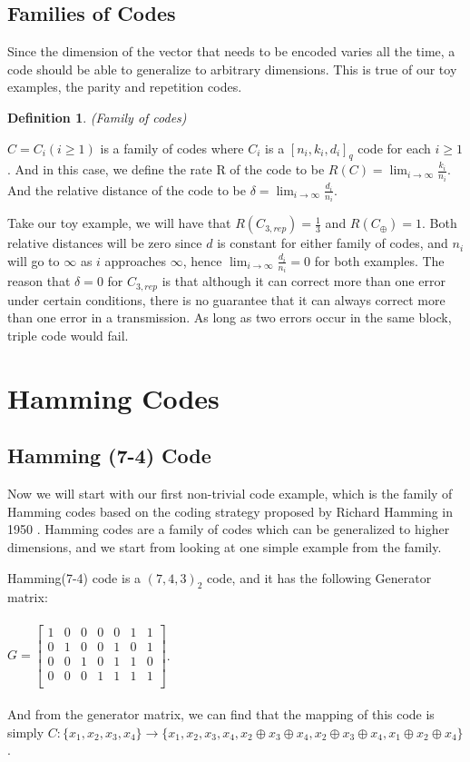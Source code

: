 \documentclass{article}
\newtheorem{Definition}{Definition}
\begin{document}
\subsection{Families of Codes}
Since the dimension of the vector that needs to be encoded varies all the time, a code should be able to generalize to arbitrary dimensions. This is true of our toy examples, the parity and repetition codes.
\begin{Definition}(Family of codes)\end{Definition}
\noindent $C = C_i(i \ge 1)$ is a family of codes where $C_i$ is a $[n_i,k_i,d_i]_q$ code for each $i \ge 1$. And in this case, we define the rate R of the code to be $ R(C) = \lim_{i\to\infty} \frac{k_i}{n_i}$. And the relative distance of the code to be $\delta = \lim_{i\to\infty} \frac{d_i}{n_i}$.

Take our toy example, we will have that $R(C_{3,rep}) = \frac{1}{3}$ and $R(C_\oplus) = 1$. Both relative distances will be zero since $d$ is constant for either family of codes, and $n_i$ will go to $\infty$ as $i$ approaches $\infty$, hence $\lim_{i\to\infty} \frac{d_i}{n_i} = 0$ for both examples. The reason that $\delta = 0$ for $C_{3,rep}$ is that although it can correct more than one error under certain conditions, there is no guarantee that it can always correct more than one error in a transmission. As long as two errors occur in the same block, triple code would fail.

\section{Hamming Codes}
\subsection{Hamming (7-4) Code}
Now we will start with our first non-trivial code example, which is the family of Hamming codes based on the coding strategy proposed by Richard Hamming in 1950 \cite{hamming-code}. Hamming codes are a family of codes which can be generalized to higher dimensions, and we start from looking at one simple example from the family.

Hamming(7-4) code is a $(7,4,3)_2$ code, and it has the following Generator matrix: \\\\
$G = \begin{bmatrix}
	1 & 0 & 0 & 0 & 0 & 1 & 1 \\
	0 & 1 & 0 & 0 & 1 & 0 & 1 \\
	0 & 0 & 1 & 0 & 1 & 1 & 0  \\
	0 & 0 & 0 & 1 & 1 & 1 & 1 \\
    \end{bmatrix}$.\\\\
And from the generator matrix, we can find that the mapping of this code is simply 
$C: \{x_1, x_2, x_3,x_4\} \rightarrow \{x_1,x_2,x_3,x_4, x_2\oplus x_3\oplus x_4,x_2\oplus x_3\oplus x_4,x_1\oplus x_2\oplus x_4\}$.
\end{document}
